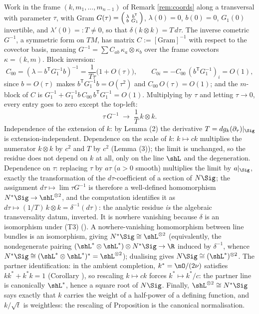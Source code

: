 Work in the frame $(k, m_1, \dots, m_{n-1})$ of Remark \ref{rem:coords} along a transversal with parameter $\tau$, with Gram $G(\tau) = \begin{psmallmatrix} \lambda & b^{\mathsf T} \\ b & G_1 \end{psmallmatrix}$, $\lambda(0) = 0$, $b(0) = 0$, $G_1(0)$ invertible, and $\lambda'(0) =: T \neq 0$, so that $\delta(k \otimes k) = T\, d\tau$. The inverse cometric $G^{-1}$, a symmetric form on $TM$, has matrix $C := [\text{Gram}]^{-1}$ with respect to the covector basis, meaning $G^{-1} = \sum C_{ab}\, \kappa_a \otimes \kappa_b$ over the frame covectors $\kappa = (k, m)$. Block inversion:
\[
C_{00} = (\lambda - b^{\mathsf T} G_1^{-1} b)^{-1} = \frac{1}{T\tau}\bigl(1 + O(\tau)\bigr), \qquad
C_{0i} = -C_{00}\, (b^{\mathsf T} G_1^{-1})_i = O(1),
\]
since $b = O(\tau)$ makes $b^{\mathsf T} G_1^{-1} b = O(\tau^2)$ and $C_{00}\,O(\tau) = O(1)$; and the $m$-block of $C$ is $G_1^{-1} + G_1^{-1} b\, C_{00}\, b^{\mathsf T} G_1^{-1} = O(1)$. Multiplying by $\tau$ and letting $\tau \to 0$, every entry goes to zero except the top-left:
\[
\tau\, G^{-1} \;\longrightarrow\; \frac{1}{T}\, k \otimes k .
\]
Independence of the extension of $k$: by Lemma (2) the derivative $T = dg_k(\partial_\tau)|_\Sig$ is extension-independent. Dependence on the scale of $k$: $k \mapsto ck$ multiplies the numerator $k \otimes k$ by $c^2$ and $T$ by $c^2$ (Lemma (3)); the limit is unchanged, so the residue does not depend on $k$ at all, only on the line $\shL$ and the degeneration. Dependence on $\tau$: replacing $\tau$ by $a\tau$ ($a > 0$ smooth) multiplies the limit by $a|_\Sig$, exactly the transformation of the $d\tau$-coefficient of a section of $N\Sig$; the assignment $d\tau \mapsto \lim \tau G^{-1}$ is therefore a well-defined homomorphism $N^*\Sig \to \shL^{\otimes 2}$, and the computation identifies it as $d\tau \mapsto (1/T)\,k \otimes k = \delta^{-1}(d\tau)$: the analytic residue \emph{is} the algebraic transversality datum, inverted. It is nowhere vanishing because $\delta$ is an isomorphism under (T3) (). A nowhere-vanishing homomorphism between line bundles is an isomorphism, giving $N^*\Sig \cong \shL^{\otimes 2}$ (equivalently, the nondegenerate pairing $(\shL^* \otimes \shL^*) \otimes N^*\Sig \to \R$ induced by $\delta^{-1}$, whence $N^*\Sig \cong (\shL^* \otimes \shL^*)^* = \shL^{\otimes 2}$); dualising gives $N\Sig \cong (\shL^*)^{\otimes 2}$. The partner identification: in the ambient completion, $k^* = \nO/(2\nu)$ satisfies $kk^* + k^*k = 1$ (Corollary ), so rescaling $k \mapsto ck$ forces $k^* \mapsto k^*/c$: the partner line is canonically $\shL^*$, hence a square root of $N\Sig$. Finally, $\shL^{\otimes 2} \cong N^*\Sig$ says exactly that $k$ carries the weight of a half-power of a defining function, and $k/\sqrt t$ is weightless: the rescaling of Proposition  is the canonical normalisation.
